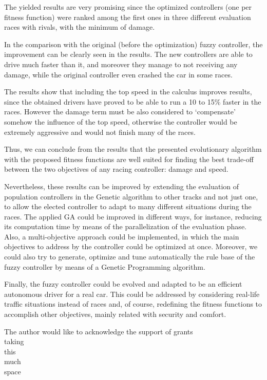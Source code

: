 \documentclass[sigconf]{acmart}
\begin{document}
The yielded results are very promising since the optimized controllers (one per fitness function) were ranked among the first ones in three different evaluation races with rivals, with the minimum of damage.

In the comparison with the original (before the optimization) fuzzy controller, the improvement can be clearly seen in the results. The new controllers are able to drive much faster than it, and moreover they manage to not receiving any damage, while the original controller even crashed the car in some races.

The results show that including the top speed in the calculus improves
results, since the obtained drivers have proved to be able to run a 10
to 15\% faster in the races. However the damage term must be also
considered to `compensate' somehow the influence of the top speed,
otherwise the controller would be extremely aggressive and would not
finish many of the races.

Thus, we can conclude from the results that the presented evolutionary
algorithm with the
proposed fitness functions are well suited for finding the best
trade-off between the two objectives of any racing controller: damage
and speed. 

Nevertheless, these results can be improved by extending the
evaluation of population controllers in the Genetic algorithm to other
tracks and not just one, to allow the elected controller to adapt to many different situations during the races.
The applied GA could be improved in different ways, for instance, reducing its computation time by means of the parallelization of the evaluation phase.
Also, a multi-objective approach could be implemented, in which the main objectives to address by the controller could be optimized at once.
Moreover, we could also try to generate, optimize and tune
automatically the rule base of the fuzzy controller by means of a
Genetic Programming algorithm.  

Finally, the fuzzy controller could be evolved and adapted to be an efficient autonomous driver for a real car. This could be addressed by considering real-life traffic situations instead of races and, of course, redefining the fitness functions to accomplish other objectives, mainly related with security and comfort.

\begin{acks}

  The author would like to acknowledge the support of grants\\
  taking\\
  this\\
  much\\
  space\\

\end{acks}




\end{document}
